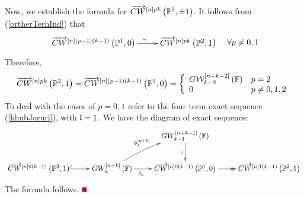 \documentclass[12pt]{article}
\begin{document}
 Now, we establish the formula for $\ora{CW}^{\LRt{n}pk}\LRf{{\BP}^2, \pm 1}$. It follows from 
 (\ref{ortherTerhInd}) that
 $$
  \diagram
  \ora{CW}^{\LRt{n}(p-1)(k-1)}\LRf{{\BP}^{1}, 0} \ar[r]^{\qquad\quad \sim\qquad} &
 \ora{CW}^{\LRt{n}pk}\LRf{{\BP}^2, 1} \\
 \enddiagram
 \quad \forall p\neq 0, 1
 $$
 Therefore,
 $$
  \ora{CW}^{\LRt{n}pk}\LRf{{\BP}^2, 1}= \ora{CW}^{\LRt{n}(p-1)(k-1)}\LRf{{\BP}^{1}, 0}
  =\LBrace{{ll}
  G{\CW}^{\LRt{n+k-2}}_{k-2}\LRf{{\BF}}& p=2\\
  0 & p\neq 0, 1, 2\\
  }
 $$
 To deal with the cases of $p=0, 1$ refer to the four term exact sequence (\ref{khubJoruri}), with $\l=1$. We have the diagram of exact sequence:
%
$$
  \diagram
 && GW^{\LRt{n+k-1}}_{k-1}\LRf{{\BF}}\ar[d]_{\wr}&  \\
 \ora{CW}^{\LRt{n}0(k-1)}\LRf{{\BP}^{2}, 1}  \ar@{^(->}[r]&   GW^{\LRt{n+k}}_k\LRf{{\BF}}  \ar[r]_{\delta_k\qquad}\ar@/^/[ru]^{\b^{\LRt{n+k}}_k}& \ora{CW}^{\LRt{n}0(k-1)}\LRf{{\BP}^{1}, 0} \ar@{->>}[r]&   \ora{CW}^{\LRt{n}1(k-1)}\LRf{{\BP}^{2}, 1}  \\
 \enddiagram
 $$
The formula follows. \pic $\eop$ 
 
\end{document}
